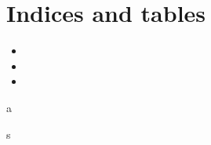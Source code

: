 \documentclass[letterpaper,10pt,ngerman]{sphinxmanual}
\begin{document}
\chapter{Indices and tables}
\label{\detokenize{index:indices-and-tables}}\begin{itemize}
\item {} 

\item {} 

\item {} 

\end{itemize}


\renewcommand{\indexname}{Python-Modulindex}
\begin{sphinxtheindex}
\def\bigletter#1{{\Large\sffamily#1}\nopagebreak\vspace{1mm}}
\bigletter{a}
\item {}
\indexspace
\bigletter{s}
\item {}
\end{sphinxtheindex}

\renewcommand{\indexname}{Stichwortverzeichnis}
\printindex
\end{document}
